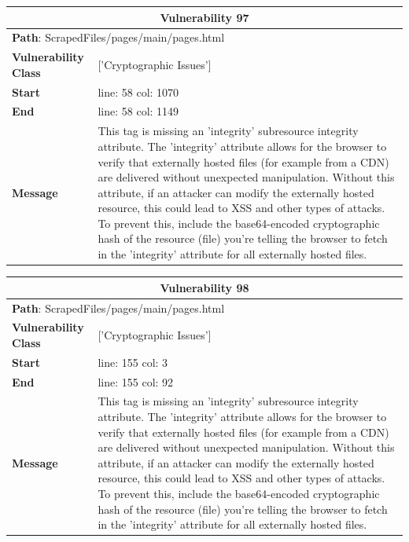 \documentclass[12pt]{article}
\begin{document}
\FloatBarrier
\begin{table}[!h]
\centering
\renewcommand{\arraystretch}{1.3}
\begin{tabular}{|l|p{10cm}|}
\hline
\multicolumn{2}{|c|}{\textbf{Vulnerability 97}} \\
\hline
\multicolumn{2}{|l|}{\textbf{Path}: ScrapedFiles/pages/main/pages.html} \\
\hline
\textbf{Vulnerability Class} & ['Cryptographic Issues'] \\
\hline
\textbf{Start} & line: 58 \quad col: 1070 \\
\hline
\textbf{End} & line: 58 \quad col: 1149 \\
\hline
\textbf{Message} & This tag is missing an 'integrity' subresource integrity attribute. The 'integrity' attribute allows for the browser to verify that externally hosted files (for example from a CDN) are delivered without unexpected manipulation. Without this attribute, if an attacker can modify the externally hosted resource, this could lead to XSS and other types of attacks. To prevent this, include the base64-encoded cryptographic hash of the resource (file) you're telling the browser to fetch in the 'integrity' attribute for all externally hosted files. \\
\hline
\end{tabular}
\end{table}
\vspace{0.7cm}
\FloatBarrier
\begin{table}[!h]
\centering
\renewcommand{\arraystretch}{1.3}
\begin{tabular}{|l|p{10cm}|}
\hline
\multicolumn{2}{|c|}{\textbf{Vulnerability 98}} \\
\hline
\multicolumn{2}{|l|}{\textbf{Path}: ScrapedFiles/pages/main/pages.html} \\
\hline
\textbf{Vulnerability Class} & ['Cryptographic Issues'] \\
\hline
\textbf{Start} & line: 155 \quad col: 3 \\
\hline
\textbf{End} & line: 155 \quad col: 92 \\
\hline
\textbf{Message} & This tag is missing an 'integrity' subresource integrity attribute. The 'integrity' attribute allows for the browser to verify that externally hosted files (for example from a CDN) are delivered without unexpected manipulation. Without this attribute, if an attacker can modify the externally hosted resource, this could lead to XSS and other types of attacks. To prevent this, include the base64-encoded cryptographic hash of the resource (file) you're telling the browser to fetch in the 'integrity' attribute for all externally hosted files. \\
\hline
\end{tabular}
\end{table}
\end{document}
